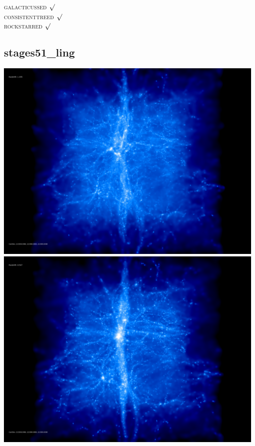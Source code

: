 \textsc{galacticussed} $\surd$ \\
\textsc{consistenttreed} $\surd$ \\ 
\textsc{rockstarred} $\surd$



% 
%
%
%
%
%
%
%


\newpage
\subsection{stages51\_ling}

\includegraphics[scale=0.1]{r256/stages51_ling/50.jpg} 
\includegraphics[scale=0.1]{r256/stages51_ling/100.jpg}  \\

